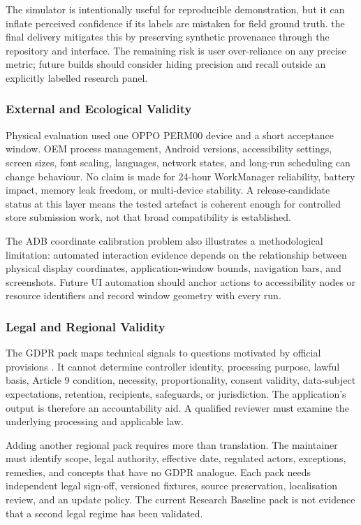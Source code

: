 The simulator is intentionally useful for reproducible demonstration, but it can inflate perceived confidence if its labels are mistaken for field ground truth. the final delivery mitigates this by preserving synthetic provenance through the repository and interface. The remaining risk is user over-reliance on any precise metric; future builds should consider hiding precision and recall outside an explicitly labelled research panel.

\subsubsection{External and Ecological Validity}

Physical evaluation used one OPPO PERM00 device and a short acceptance window. OEM process management, Android versions, accessibility settings, screen sizes, font scaling, languages, network states, and long-run scheduling can change behaviour. No claim is made for 24-hour WorkManager reliability, battery impact, memory leak freedom, or multi-device stability. A release-candidate status at this layer means the tested artefact is coherent enough for controlled store submission work, not that broad compatibility is established.

The ADB coordinate calibration problem also illustrates a methodological limitation: automated interaction evidence depends on the relationship between physical display coordinates, application-window bounds, navigation bars, and screenshots. Future UI automation should anchor actions to accessibility nodes or resource identifiers and record window geometry with every run.

\subsubsection{Legal and Regional Validity}

The GDPR pack maps technical signals to questions motivated by official provisions \cite{eurlex2016}. It cannot determine controller identity, processing purpose, lawful basis, Article 9 condition, necessity, proportionality, consent validity, data-subject expectations, retention, recipients, safeguards, or jurisdiction. The application's output is therefore an accountability aid. A qualified reviewer must examine the underlying processing and applicable law.

Adding another regional pack requires more than translation. The maintainer must identify scope, legal authority, effective date, regulated actors, exceptions, remedies, and concepts that have no GDPR analogue. Each pack needs independent legal sign-off, versioned fixtures, source preservation, localisation review, and an update policy. The current Research Baseline pack is not evidence that a second legal regime has been validated.

